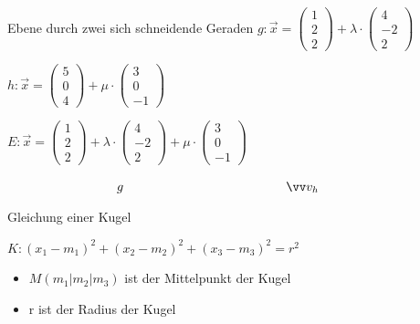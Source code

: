 \documentclass[paper=a6,landscape,ngerman,twoside=true,fontsize=12pt]{scrartcl}
\begin{document}
\begin{frage}
	\LARGE
	Ebene durch zwei sich schneidende Geraden
	\large
	$g:\vec{x}=\left(\begin{array}{c} 1 \\ 2 \\ 2\end{array} \right)+\lambda \cdot \left(\begin{array}{c} 4 \\ -2 \\ 2\end{array} \right)$
	
	$h:\vec{x}=\left(\begin{array}{c} 5 \\ 0 \\ 4\end{array} \right)+\mu \cdot \left(\begin{array}{c} 3 \\ 0 \\ -1\end{array} \right)$
\end{frage}
\begin{antwort}
	
	$E:\vec{x}=\left(\begin{array}{c} 1 \\ 2 \\ 2\end{array} \right)+\lambda \cdot \left(\begin{array}{c} 4 \\ -2 \\ 2\end{array} \right)+\mu \cdot \left(\begin{array}{c} 3 \\0 \\ -1\end{array} \right)$
	\bigskip
	
	$\hspace{3cm} g  \hspace{4.5cm} \vec{v_h}$
	
\end{antwort}	
\begin{frage}
	\LARGE
	Gleichung einer Kugel
\end{frage}
\begin{antwort}
	
	$K: (x_1-m_1)^2+(x_2-m_2)^2+(x_3-m_3)^2=r^2$
	
	\begin{itemize} 
		\item $M(m_1|m_2|m_3)$ ist der Mittelpunkt der Kugel
		\item r ist der Radius der Kugel	
	\end{itemize} 
\end{antwort}	
\end{document}
